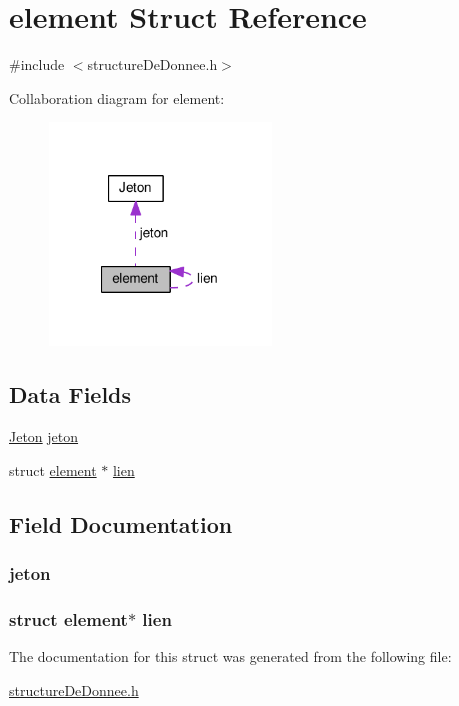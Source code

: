 \hypertarget{structelement}{\section{element Struct Reference}
\label{structelement}
}


{\ttfamily \#include $<$structure\-De\-Donnee.\-h$>$}



Collaboration diagram for element\-:\nopagebreak
\begin{figure}[H]
\begin{center}
\leavevmode
\includegraphics[width=167pt]{structelement__coll__graph}
\end{center}
\end{figure}
\subsection*{Data Fields}
\begin{DoxyCompactItemize}
\item 
\hyperlink{struct_jeton}{Jeton} \hyperlink{structelement_ad1f18dda3e603c8cf6c98ee549208114}{jeton}
\item 
struct \hyperlink{structelement}{element} $\ast$ \hyperlink{structelement_a15a89fdc2b7a3c54ea8628e307925c89}{lien}
\end{DoxyCompactItemize}


\subsection{Field Documentation}
\hypertarget{structelement_ad1f18dda3e603c8cf6c98ee549208114}{
\subsubsection[{jeton}]{ jeton}}\label{structelement_ad1f18dda3e603c8cf6c98ee549208114}
\hypertarget{structelement_a15a89fdc2b7a3c54ea8628e307925c89}{
\subsubsection[{lien}]{\setlength{\rightskip}{0pt plus 5cm}struct {\bf element}$\ast$ lien}}\label{structelement_a15a89fdc2b7a3c54ea8628e307925c89}


The documentation for this struct was generated from the following file\-:\begin{DoxyCompactItemize}
\item 
\hyperlink{structure_de_donnee_8h}{structure\-De\-Donnee.\-h}\end{DoxyCompactItemize}
